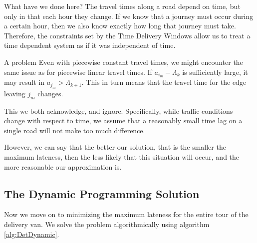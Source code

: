 What have we done here? The travel times along a road depend on time, but only in that each hour they change. If we know that a journey must occur during a certain hour, then we also know exactly how long that journey must take. Therefore, the constraints set by the Time Delivery Windows allow us to treat a time dependent system as if it was independent of time.

\begin{remark}{A problem}
	Even with piecewise constant travel times, we might encounter the same issue as for piecewise linear travel times. If $a_{i_m}-\Lambda_k$ is sufficiently large, it may result in $a_{j_m}>\Lambda_{k+1}$. This in turn means that the travel time for the edge leaving $j_m$ changes. 
	
	This we both acknowledge, and ignore. Specifically, while traffic conditions change with respect to time, we assume that a reasonably small time lag on a single road will not make too much difference. 
	
	However, we can say that the better our solution, that is the smaller the maximum lateness, then the less likely that this situation will occur, and the more reasonable our approximation is.
\end{remark}

\subsection{The Dynamic Programming Solution}
Now we move on to minimizing the maximum lateness for the entire tour of the delivery van. We solve the problem algorithmically using algorithm \ref{alg:DetDynamic}.

